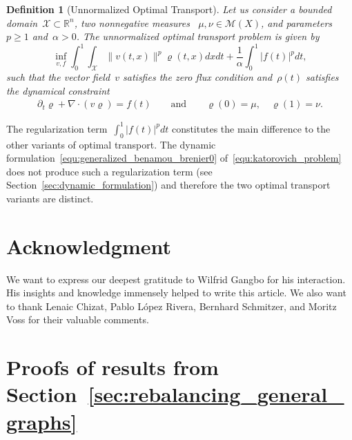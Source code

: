\documentclass{article}
\newtheorem{definition}[theorem]{Definition}
\theoremstyle{definition}
\begin{document}
\begin{definition}[Unnormalized Optimal Transport]
    Let us consider a bounded domain~$\mathcal{X} \subset \mathbb{R}^n$, two nonnegative measures ~$\mu, \nu \in \mathcal{M}(X)$, and parameters~$p \geq 1$ and~$\alpha >0$. The unnormalized optimal transport problem is given by
    \begin{equation}\label{UBB}
        \inf_{v,f} \int_0^1 \int_{\mathcal{X}} \| v(t,x)\|^p \varrho(t,x) dx dt + \frac{1}{\alpha} \int_0^1 |f(t)|^p dt, 
    \end{equation}
    such that the vector field~$v$ satisfies the zero flux condition and~$\rho(t)$ satisfies the dynamical constraint
    \begin{align*}
        \partial_t \varrho  + \nabla \cdot ( v \varrho) = f(t) \qquad \mbox{and} \qquad \varrho(0)= \mu, \quad \varrho(1)= \nu.
    \end{align*}
\end{definition}
The regularization term~$\int_0^1 |f(t)|^p dt$ constitutes the main difference to the other variants of optimal transport. The dynamic formulation~\eqref{equ:generalized_benamou_brenier0} of~\eqref{equ:katorovich_problem} does not produce such a regularization term (see Section~\ref{sec:dynamic_formulation}) and therefore the two optimal transport variants are distinct. 

\section*{Acknowledgment}
We want to express our deepest gratitude to Wilfrid Gangbo for his interaction. His insights and knowledge immensely helped to write this article. We also want to thank Lenaic Chizat, Pablo L\'opez Rivera, Bernhard Schmitzer, and Moritz Voss for their valuable comments.



\appendix
\section{Proofs of results from Section~\ref{sec:rebalancing_general_graphs}}
\label{sec:existenceReb}
\end{document}
